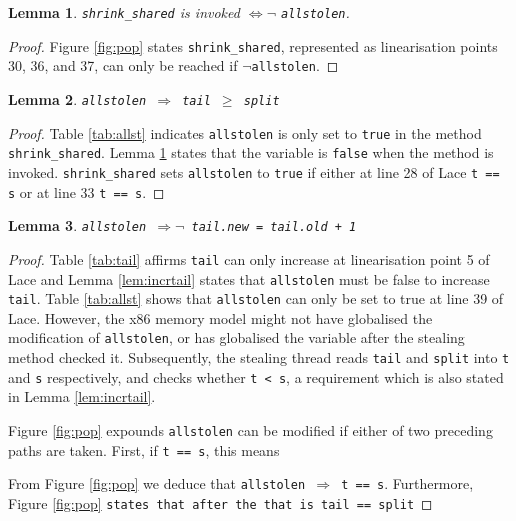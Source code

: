 \documentclass{sig-alternate-br}
\newtheorem{lemma}{Lemma}
\begin{document}
\begin{lemma}
	\texttt{shrink\_shared} is invoked $\iff \neg$ \texttt{allstolen}.
	\label{lem:shrinkallstolen}
\end{lemma}
\begin{proof}
	Figure \ref{fig:pop} states \texttt{shrink\_shared}, represented as linearisation points 30, 36, and 37, can only be reached if $\neg$\texttt{allstolen}.
\end{proof}

\begin{lemma}
	\texttt{allstolen $\Rightarrow$ tail $\geq$ split}
\end{lemma}
\begin{proof}
	Table \ref{tab:allst} indicates \texttt{allstolen} is only set to \texttt{true} in the method \texttt{shrink\_shared}.
	Lemma \ref{lem:shrinkallstolen} states that the variable is \texttt{false} when the method is invoked.
	\texttt{shrink\_shared} sets \texttt{allstolen} to \texttt{true} if either at line 28 of Lace \texttt{t == s} or at line 33 \texttt{t == s}.
\end{proof}

\begin{lemma}
	\texttt{allstolen $\Rightarrow \neg$ tail.new = tail.old + 1}
\end{lemma}
\begin{proof}
	Table \ref{tab:tail} affirms \texttt{tail} can only increase at linearisation point 5 of Lace and Lemma \ref{lem:incrtail} states that \texttt{allstolen} must be false to increase \texttt{tail}.
	Table \ref{tab:allst} shows that \texttt{allstolen} can only be set to true at line 39 of Lace.	
	However, the x86 memory model might not have globalised the modification of \texttt{allstolen}, or has globalised the variable after the stealing method checked it.
	Subsequently, the stealing thread reads \texttt{tail} and \texttt{split} into \texttt{t} and \texttt{s} respectively, and checks whether \texttt{t < s}, a requirement which is also stated in Lemma \ref{lem:incrtail}.
	
	Figure \ref{fig:pop} expounds \texttt{allstolen} can be modified if either of two preceding paths are taken.
	First, if \texttt{t == s}, this means 
	
	From Figure \ref{fig:pop} we deduce that \texttt{allstolen $\Rightarrow$ t == s}. Furthermore, Figure \ref{fig:pop} \texttt{states that after the  that is tail == split}
\end{proof}
\end{document}
